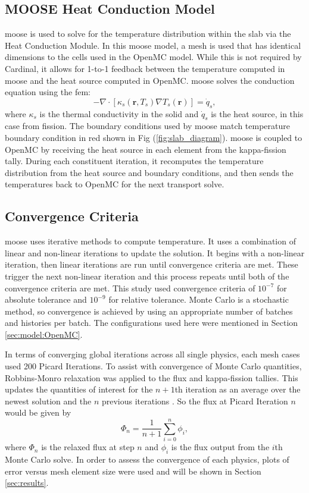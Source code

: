 \documentclass[letterpaper]{mc2023}
\begin{document}
\subsection{MOOSE Heat Conduction Model}
\gls{moose} is used to solve for the temperature distribution within the slab via the Heat Conduction Module. In this \gls{moose}
model, a mesh is used that has identical dimensions to the cells used in the OpenMC model. While this is not required by Cardinal,
it allows for 1-to-1 feedback between the temperature computed in \gls{moose} and the heat source computed in OpenMC. \gls{moose}
solves the conduction equation using the \gls{fem}:
\begin{equation}\label{eq:conduction}
    - \nabla \cdot [\kappa_{s}(\mathbf{r},T_{s}) \nabla T_{s}(\mathbf{r})] = \dot{q}_{s},
\end{equation}
where $\kappa_{s}$ is the thermal conductivity in the solid and $\dot{q}_{s}$ is the heat source, in this case from fission. The
boundary conditions used by \gls{moose} match temperature boundary condition in red shown in Fig (\ref{fig:slab_diagram}). \gls{moose}
is coupled to OpenMC by receiving the heat source in each element from the kappa-fission tally. During each constituent iteration,
it recomputes the temperature distribution from the heat source and boundary conditions, and then sends the temperatures back to
OpenMC for the next transport solve.

\subsection{Convergence Criteria}
\gls{moose} uses iterative methods to compute temperature. It uses a combination of linear and non-linear iterations to update the
solution. It begins with a non-linear iteration, then linear iterations are run until convergence criteria are met. These trigger the
next non-linear iteration and this process repeats until both of the convergence criteria are met. This study used convergence criteria
of $10^{-7}$ for absolute tolerance and $10^{-9}$ for relative tolerance. Monte Carlo is a stochastic method, so convergence is achieved
by using an appropriate number of batches and histories per batch. The configurations used here were mentioned in Section
\ref{sec:model:OpenMC}.

In terms of converging global iterations across all single physics, each mesh cases used 200 Picard Iterations. To assist with
convergence of Monte Carlo quantities, Robbins-Monro relaxation was applied to the flux and kappa-fission tallies. This updates the
quantities of interest for the $n+1$th iteration as an average over the newest solution and the $n$ previous iterations \cite{dufek}.
So the flux at Picard Iteration $n$ would be given by
\begin{equation}\label{eq:Robbins-Monro}
    \Phi_{n} = \frac{1}{n+1} \sum_{i=0}^{n} \phi_{i},
\end{equation}
where $\Phi_{n}$ is the relaxed flux at step $n$ and $\phi_{i}$ is the flux output from the $i$th Monte Carlo solve. In order to
assess the convergence of each physics, plots of error versus mesh element size were used and will be shown in Section \ref{sec:results}.
\end{document}
